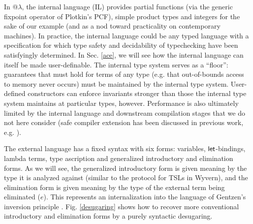 \documentclass[10pt,preprint]{sigplanconf}
\begin{document}
{In @$\lambda$, the internal language (IL) provides partial functions (via the generic fixpoint operator of Plotkin's PCF), simple product  types and integers for the sake of our example (and as a nod toward practicality on contemporary machines). In practice, the internal language could be any typed  language with a specification for which type safety and decidability of typechecking have been satisfyingly determined. In Sec. \ref{ace}, we will see how the internal language can itself be made user-definable. The internal type system serves as a ``floor'': guarantees that must hold for terms of any type (e.g. that out-of-bounds access to memory never occurs) must be maintained by the internal type system. User-defined constructors can enforce invariants stronger than those the internal type system maintains at particular types, however. Performance is also ultimately limited by the internal language and downstream compilation stages that we do not here consider (safe compiler extension has been discussed in previous work, e.g. \cite{conf/pldi/TatlockL10}).

The external language has a fixed syntax with six forms: variables, ${\sf let}$-bindings, lambda terms, type ascription and generalized introductory and elimination forms. As we will see, the generalized introductory form is given meaning by the type it is analyzed against (similar to the protocol for TSLs in Wyvern), and the elimination form is given meaning by the type of the external term being eliminated ($e$). This represents an internalization into the language of Gentzen's inversion principle \cite{gentzen}. Fig. \ref{desugaring} shows how to recover more conventional introductory and elimination forms by a purely syntactic desugaring.%

}
\end{document}
